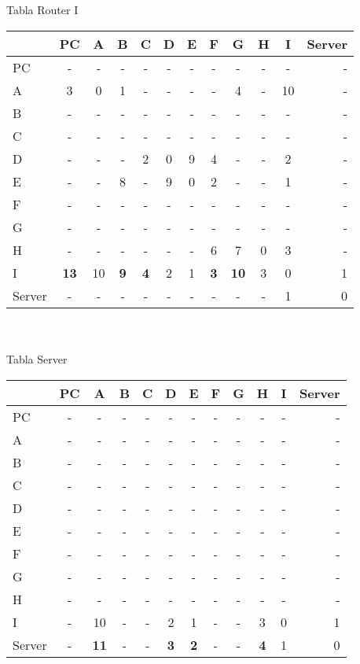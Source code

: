 \documentclass{article}
\begin{document}
\\
\\
Tabla Router I \\
\begin{tabular}{l*{10}{c}r}
              & PC & A & B & C & D & E & F & G & H & I & Server \\
\hline
PC             & - & - & - & - & - & - & - & - & - & - & -\\
A              & 3 & 0 & 1 & - & - & - & - & 4 & - & 10 & -\\
B              & - & - & - & - & - & - & - & - & - & - & -\\
C              & - & - & - & - & - & - & - & - & - & - & -\\
D              & - & - & - & 2 & 0 & 9 & 4 & - & - & 2 & -\\
E              & - & - & 8 & - & 9 & 0 & 2 & - & - & 1 & -\\
F              & - & - & - & - & - & - & - & - & - & - & -\\
G              & - & - & - & - & - & - & - & - & - & - & -\\
H              & - & - & - & - & - & - & 6 & 7 & 0 & 3 & -\\
I              &\bf{13}& 10 &\bf{9}&\bf{4}& 2 & 1 &\bf{3}&\bf{10}& 3 & 0 & 1\\
Server         & - & - & - & - & - & - & - & - & - & 1 & 0\\

\end{tabular}
\\
\\
Tabla Server \\
\begin{tabular}{l*{10}{c}r}
              & PC & A & B & C & D & E & F & G & H & I & Server \\
\hline
PC             & - & - & - & - & - & - & - & - & - & - & -\\
A              & - & - & - & - & - & - & - & - & - & - & -\\
B              & - & - & - & - & - & - & - & - & - & - & -\\
C              & - & - & - & - & - & - & - & - & - & - & -\\
D              & - & - & - & - & - & - & - & - & - & - & -\\
E              & - & - & - & - & - & - & - & - & - & - & -\\
F              & - & - & - & - & - & - & - & - & - & - & -\\
G              & - & - & - & - & - & - & - & - & - & - & -\\
H              & - & - & - & - & - & - & - & - & - & - & -\\
I              & - & 10 & - & - & 2 & 1 & - & - & 3 & 0 & 1\\
Server         & - &\bf{11}& - & - &\bf{3}&\bf{2}& - & - &\bf{4}& 1 & 0\\

\end{tabular}
\end{document}
